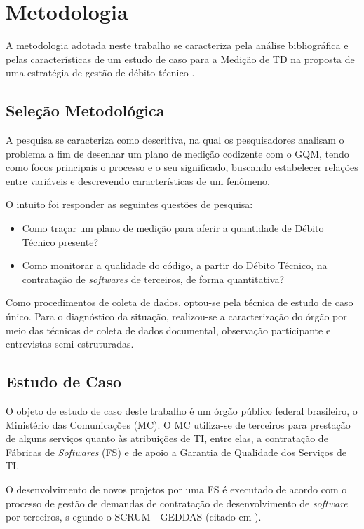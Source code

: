 \chapter[Metodologia]{Metodologia}
A metodologia adotada neste trabalho se caracteriza pela análise bibliográfica e
pelas características de um estudo de caso para a Medição de TD na proposta de
uma estratégia de gestão de débito técnico \cite{td}.

\section{Seleção Metodológica}
A pesquisa se caracteriza como descritiva, na qual os pesquisadores analisam o problema
a fim de desenhar um plano de medição codizente com o GQM, tendo como focos
principais o processo e o seu significado,
buscando estabelecer relações entre variáveis e descrevendo características de
um fenômeno.

O intuito foi responder as seguintes questões de pesquisa:

\begin{itemize}
  \item Como traçar um plano de medição para aferir a quantidade de Débito Técnico
  presente?

  \item Como monitorar a qualidade do código, a partir do Débito Técnico, na
  contratação de \textit{softwares} de terceiros, de forma quantitativa?
\end{itemize}

Como procedimentos de coleta de dados, optou-se pela técnica de estudo de caso
único. Para o diagnóstico da situação, realizou-se a caracterização do órgão por
meio das técnicas de coleta de dados documental, observação participante e
entrevistas semi-estruturadas.

\section{Estudo de Caso}
O objeto de estudo de caso deste trabalho é um órgão público federal brasileiro,
o Ministério das Comunicações (MC). O MC utiliza-se de terceiros para prestação
de alguns serviços quanto às atribuições de TI, entre elas, a contratação de
Fábricas de \textit{Softwares} (FS) e de apoio a Garantia de Qualidade dos Serviços de TI.

O desenvolvimento de novos projetos por uma FS é executado de acordo com o processo
de gestão de demandas de contratação de desenvolvimento de \textit{software} por terceiros, s
egundo o SCRUM - GEDDAS (citado em \cite{souza}).

